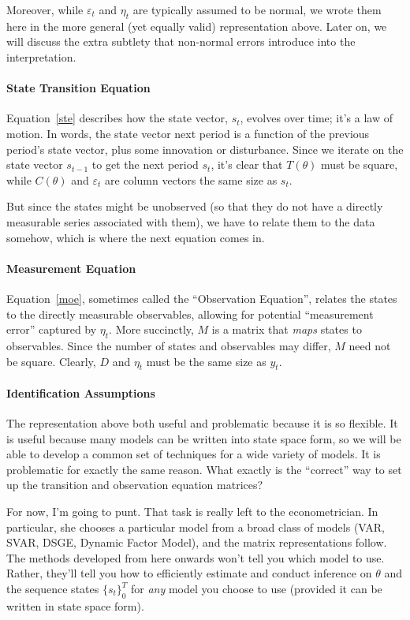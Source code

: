 \documentclass[a4paper,12pt]{article}
\begin{document}
Moreover, while $\varepsilon_t$ and $\eta_t$ are typically assumed to be
normal, we wrote them here in the more general (yet equally valid)
representation above. Later on, we will discuss the extra subtlety that
non-normal errors introduce into the interpretation.

\paragraph{State Transition Equation} Equation~\ref{ste} describes how
the state vector, $s_t$, evolves over time; it's a law of motion. In
words, the state vector next period is a function of the previous
period's state vector, plus some innovation or disturbance.  Since we
iterate on the state vector $s_{t-1}$ to get the next period $s_{t}$,
it's clear that $T(\theta)$ must be square, while $C(\theta)$ and
$\varepsilon_t$ are column vectors the same size as $s_t$. 

But since the states might be unobserved (so that they do not have a
directly measurable series associated with them), we have to relate them
to the data somehow, which is where the next equation comes in.

\paragraph{Measurement Equation} Equation~\ref{moe}, sometimes called
the ``Observation Equation'', relates the states to the directly
measurable observables, allowing for potential ``measurement error''
captured by $\eta_t$. More succinctly, $M$ is a matrix that \emph{maps}
states to observables. Since the number of states and observables may
differ, $M$ need not be square. Clearly, $D$ and $\eta_t$ must be the
same size as $y_t$.

\paragraph{Identification Assumptions} 
The representation above both useful and problematic because it is so
flexible.  It is useful because many models can be written into state
space form, so we will be able to develop a common set of techniques for
a wide variety of models. It is problematic for exactly the same reason.
What exactly is the ``correct'' way to set up the transition and
observation equation matrices?

For now, I'm going to punt. That task is really left to the
econometrician. In particular, she chooses a particular model from a
broad class of models (VAR, SVAR, DSGE, Dynamic Factor Model), and the
matrix representations follow. The methods developed from here onwards
won't tell you which model to use. Rather, they'll tell you how to
efficiently estimate and conduct inference on $\theta$ and the sequence
states $\{s_t\}_0^T$ for \emph{any} model you choose to use (provided it
can be written in state space form).
\end{document}
